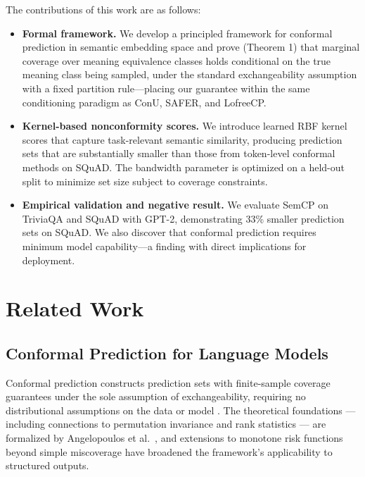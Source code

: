 \documentclass{article}
\begin{document}
The contributions of this work are as follows:

\begin{itemize}
  \item \textbf{Formal framework.} We develop a principled framework for conformal prediction in semantic embedding space and prove (Theorem 1) that marginal coverage over meaning equivalence classes holds conditional on the true meaning class being sampled, under the standard exchangeability assumption with a fixed partition rule---placing our guarantee within the same conditioning paradigm as ConU, SAFER, and LofreeCP.
  \item \textbf{Kernel-based nonconformity scores.} We introduce learned RBF kernel scores that capture task-relevant semantic similarity, producing prediction sets that are substantially smaller than those from token-level conformal methods on SQuAD. The bandwidth parameter is optimized on a held-out split to minimize set size subject to coverage constraints.
  \item \textbf{Empirical validation and negative result.} We evaluate SemCP on TriviaQA and SQuAD with GPT-2, demonstrating 33\% smaller prediction sets on SQuAD. We also discover that conformal prediction requires minimum model capability---a finding with direct implications for deployment.
\end{itemize}

\section{Related Work}

\label{sec:related_work}

\subsection{Conformal Prediction for Language Models}

\label{sec:conformal_prediction_for_language_models}

Conformal prediction constructs prediction sets with finite-sample coverage guarantees under the sole assumption of exchangeability, requiring no distributional assumptions on the data or model \cite{angelopoulos2021gentle}. The theoretical foundations --- including connections to permutation invariance and rank statistics --- are formalized by Angelopoulos et al.\ \cite{angelopoulos2024theoretical}, and extensions to monotone risk functions beyond simple miscoverage \cite{angelopoulos2022conformal} have broadened the framework's applicability to structured outputs.
\end{document}
